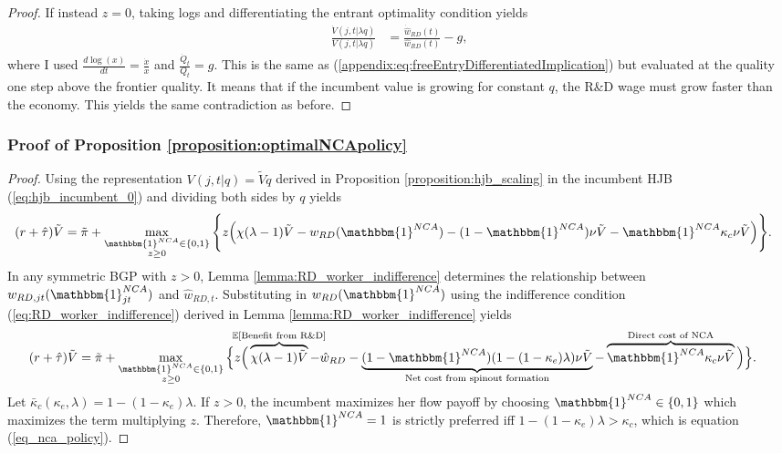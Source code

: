 \documentclass[ecta,nameyear,final]{econsocart}
\theoremstyle{definition}
\begin{document}
\begin{proof}
	If instead $z = 0$, taking logs and differentiating the entrant optimality condition yields
	\begin{align}
		\frac{\dot{V}(j,t|\lambda q)}{V(j,t|\lambda q)} &= \frac{\dot{\hat{w}}_{RD}(t)}{\hat{w}_{RD}(t)} - g,
	\end{align}
	where I used $\frac{d\log(x)}{dt} = \frac{\dot{x}}{x}$ and $\frac{\dot{Q}_t}{Q_t} = g$. This is the same as (\ref{appendix:eq:freeEntryDifferentiatedImplication}) but evaluated at the quality one step above the frontier quality. It means that if the incumbent value is growing for constant $q$, the R\&D wage must grow faster than the economy. This yields the same contradiction as before. 
\end{proof}

\subsubsection{Proof of Proposition \ref{proposition:optimalNCApolicy}}\label{appendix:proofs:proposition:optimalNCApolicy}

\begin{proof}
	Using the representation $V(j,t|q) = \tilde{V}q$ derived in Proposition \ref{proposition:hjb_scaling} in the incumbent HJB (\ref{eq:hjb_incumbent_0}) and dividing both sides by $q$ yields
	\begin{align*}
		(r + \hat{\tau}) &\tilde{V} = \tilde{\pi} + \max_{\substack{\mathbbm{1}^{NCA} \in \{0,1\} \\ z \ge 0}} \Bigg\{ z \Big( \chi (\lambda -1) \tilde{V}- w_{RD}(\mathbbm{1}^{NCA}) - (1-\mathbbm{1}^{NCA}) \nu \tilde{V} - \mathbbm{1}^{NCA} \kappa_c \nu \tilde{V} \Big)\Bigg\}.
	\end{align*}
	In any symmetric BGP with $z > 0$, Lemma \ref{lemma:RD_worker_indifference} determines the relationship between $w_{RD,jt}(\mathbbm{1}^{NCA}_{jt})$ and $\hat{w}_{RD,t}$.  Substituting in $w_{RD}(\mathbbm{1}^{NCA})$ using the indifference condition (\ref{eq:RD_worker_indifference}) derived in Lemma \ref{lemma:RD_worker_indifference} yields
	\begin{align*}
		(r + \hat{\tau}) \tilde{V} &= \tilde{\pi} + \max_{\substack{\mathbbm{1}^{NCA} \in \{0,1\} \\ z \ge 0}} \Big\{z \Big( \overbrace{\chi (\lambda - 1) \tilde{V}}^{\mathclap{\mathbb{E}[\textrm{Benefit from R\&D}]}}- \hat{w}_{RD} -  \underbrace{(1-\mathbbm{1}^{NCA})(1 - (1-\kappa_{e})\lambda)\nu \tilde{V}}_{\mathclap{\text{Net cost from spinout formation}}} - \overbrace{\mathbbm{1}^{NCA} \kappa_{c} \nu \tilde{V}}^{\mathclap{\text{Direct cost of NCA}}}\Big) \Big\}.
	\end{align*}
	Let $\bar{\kappa}_c (\kappa_e, \lambda) = 1 - (1-\kappa_e)\lambda$. If $z > 0$, the incumbent maximizes her flow payoff by choosing $\mathbbm{1}^{NCA} \in \{0,1\}$ which maximizes the term multiplying $z$. Therefore, $\mathbbm{1}^{NCA} = 1$ is strictly preferred iff $1 - (1-\kappa_e) \lambda > \kappa_c$, which is equation (\ref{eq_nca_policy}).
\end{proof}
\end{document}
